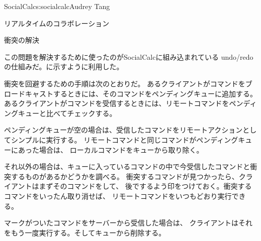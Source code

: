 \begin{aosachapter}{SocialCalc}{s:socialcalc}{Audrey Tang}
\begin{aosasect1}{リアルタイムのコラボレーション}
\begin{aosasect2}{衝突の解決}

この問題を解決するために使ったのがSocialCalcに組み込まれている
undo/redoの仕組みだ。に示すように利用した。


衝突を回避するための手順は次のとおりだ。
あるクライアントがコマンドをブロードキャストするときには、そのコマンドをペンディングキューに追加する。
あるクライアントがコマンドを受信するときには、リモートコマンドをペンディングキューと比べてチェックする。

ペンディングキューが空の場合は、受信したコマンドをリモートアクションとしてシンプルに実行する。
リモートコマンドと同じコマンドがペンディングキューにあった場合は、
ローカルコマンドをキューから取り除く。

それ以外の場合は、キューに入っているコマンドの中で今受信したコマンドと衝突するものがあるかどうかを調べる。
衝突するコマンドが見つかったら、クライアントはまずそのコマンドをして、
後でするよう印をつけておく。衝突するコマンドをいったん取り消せば、
リモートコマンドをいつもどおり実行できる。

マークがついたコマンドをサーバーから受信した場合は、
クライアントはそれをもう一度実行する。そしてキューから削除する。



\end{aosasect2}
\end{aosasect1}
\end{aosachapter}
